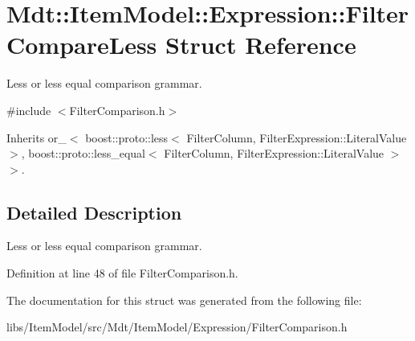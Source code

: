 \hypertarget{struct_mdt_1_1_item_model_1_1_expression_1_1_filter_compare_less}{}\section{Mdt\+:\+:Item\+Model\+:\+:Expression\+:\+:Filter\+Compare\+Less Struct Reference}
\label{struct_mdt_1_1_item_model_1_1_expression_1_1_filter_compare_less}


Less or less equal comparison grammar.  




{\ttfamily \#include $<$Filter\+Comparison.\+h$>$}



Inherits or\+\_\+$<$ boost\+::proto\+::less$<$ Filter\+Column, Filter\+Expression\+::\+Literal\+Value $>$, boost\+::proto\+::less\+\_\+equal$<$ Filter\+Column, Filter\+Expression\+::\+Literal\+Value $>$ $>$.



\subsection{Detailed Description}
Less or less equal comparison grammar. 

Definition at line 48 of file Filter\+Comparison.\+h.



The documentation for this struct was generated from the following file\+:\begin{DoxyCompactItemize}
\item 
libs/\+Item\+Model/src/\+Mdt/\+Item\+Model/\+Expression/Filter\+Comparison.\+h\end{DoxyCompactItemize}
